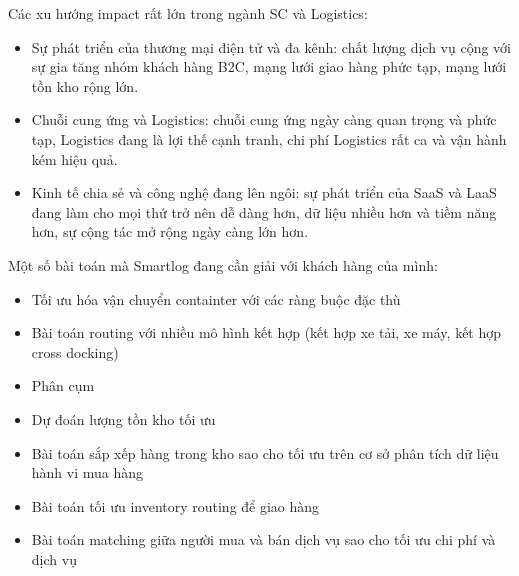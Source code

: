 \documentclass[14pt, a4paper]{article}
\numberwithin{equation}{section}
\numberwithin{figure}{section}
\numberwithin{dl}{section}
\numberwithin{md}{section}
\numberwithin{bd}{section}
\numberwithin{dn}{section}
\numberwithin{hq}{section}
\begin{document}
    Các xu hướng impact rất lớn trong ngành SC và Logistics:

    \begin{itemize}
        \item Sự phát triển của thương mại điện tử và đa kênh: chất lượng dịch vụ cộng với sự gia tăng nhóm khách hàng B2C, mạng lưới giao hàng phức tạp, mạng lưới tồn kho rộng lớn.
        \item Chuỗi cung ứng và Logistics: chuỗi cung ứng ngày càng quan trọng và phức tạp, Logistics đang là lợi thế cạnh tranh, chi phí Logistics rất ca và vận hành kém hiệu quả.
        \item Kinh tế chia sẻ và công nghệ đang lên ngôi: sự phát triển của SaaS và LaaS đang làm cho mọi thứ trở nên dễ dàng hơn, dữ liệu nhiều hơn và tiềm năng hơn, sự cộng tác mở rộng ngày càng lớn hơn.
    \end{itemize}

    Một số bài toán mà Smartlog đang cần giải với khách hàng của mình:

    \begin{itemize}
        \item Tối ưu hóa vận chuyển containter với các ràng buộc đặc thù
        \item Bài toán routing với nhiều mô hình kết hợp (kết hợp xe tải, xe máy, kết hợp cross docking)
        \item Phân cụm
        \item Dự đoán lượng tồn kho tối ưu
        \item Bài toán sắp xếp hàng trong kho sao cho tối ưu trên cơ sở phân tích dữ liệu hành vi mua hàng
        \item Bài toán tối ưu inventory routing để giao hàng
        \item Bài toán matching giữa người mua và bán dịch vụ sao cho tối ưu chi phí và dịch vụ
    \end{itemize}
\end{document}
